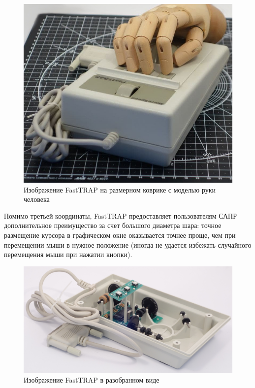 \documentclass[11pt, a4paper]{article}
\begin{document}
\begin{figure}[h]
    \centering
    \includegraphics[scale=0.25]{1987_microspeed_fasttrap/fast1.jpg}
    \caption{Изображение FastTRAP на размерном коврике с моделью руки человека}
    \label{fig:FastTRAPHand}
\end{figure}

Помимо третьей координаты, FastTRAP предоставляет пользователям САПР дополнительное преимущество за счет большого диаметра шара: точное размещение курсора в графическом окне оказывается точнее проще, чем при перемещении мыши в нужное положение (иногда не удается избежать случайного перемещения мыши при нажатии кнопки).

\begin{figure}[h]
    \centering
    \includegraphics[scale=0.5]{1987_microspeed_fasttrap/sony.jpg}
    \caption{Изображение FastTRAP в разобранном виде}
    \label{fig:FastTRAPInside}
\end{figure}
\end{document}
